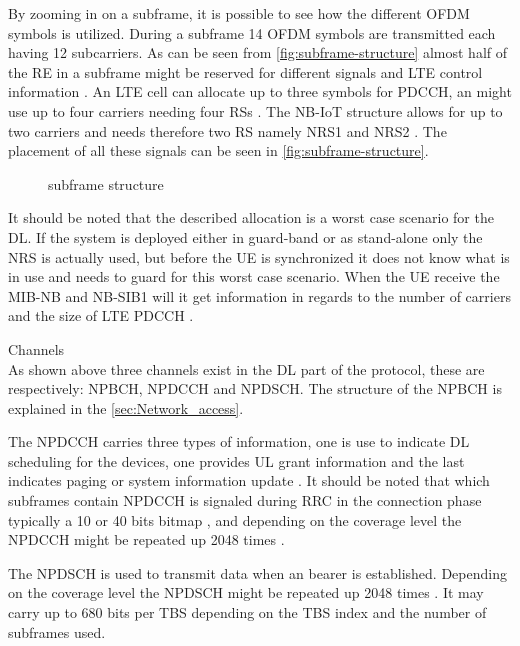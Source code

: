 By zooming in on a subframe, it is possible to see how the different \gls{OFDM} symbols is utilized. During a subframe 14 \gls{OFDM} symbols are transmitted each having 12 subcarriers. As can be seen from \autoref{fig:subframe-structure} almost half of the \gls{RE} in a subframe might be reserved for different signals and \gls{LTE} control information \citep{REL-13}. An \gls{LTE} cell can allocate up to three symbols for \gls{PDCCH}, an might use up to four carriers needing four \gls{RS}s \citep{whitepaper}. The \gls{NB-IoT} structure allows for up to two carriers and needs therefore two \gls{RS} namely \gls{NRS}1 and \gls{NRS}2 \citep{REL-13}. The placement of all these signals can be seen in \autoref{fig:subframe-structure}.  

\begin{figure}[H]
\centering

\caption{subframe structure \citep{whitepaper,REL-13}}
\label{fig:subframe-structure}
\end{figure}

It should be noted that the described allocation is a worst case scenario for the \gls{DL}. If the system is deployed either in guard-band or as stand-alone only the \gls{NRS} is actually used, but before the \gls{UE} is synchronized it does not know what is in use and needs to guard for this worst case scenario. When the \gls{UE} receive the \gls{MIB-NB} and \gls{NB-SIB}1 will it get information in regards to the number of carriers and the size of \gls{LTE} \gls{PDCCH} \citep{whitepaper}. 

Channels\\ 
As shown above three channels exist in the \gls{DL} part of the protocol, these are respectively: \gls{NPBCH}, \gls{NPDCCH} and \gls{NPDSCH}. The structure of the \gls{NPBCH} is explained in the \autoref{sec:Network_access}.

The \gls{NPDCCH} carries three types of information, one is use to indicate \gls{DL} scheduling for the devices, one provides \gls{UL} grant information and the last indicates paging or system information update \citep{NB-IoT_Book}. It should be noted that which subframes contain \gls{NPDCCH} is signaled during \gls{RRC} in the connection phase typically a 10 or 40 bits bitmap \citep{whitepaper}, and depending on the coverage level the \gls{NPDCCH} might be repeated up 2048 times \citep{NB-IoT_Book}.

The \gls{NPDSCH} is used to transmit data when an bearer is established. Depending on the coverage level the \gls{NPDSCH} might be repeated up 2048 times \citep{NB-IoT_Book}. It may carry up to 680 bits per \gls{TBS} depending on the \gls{TBS} index and the number of subframes used. 

